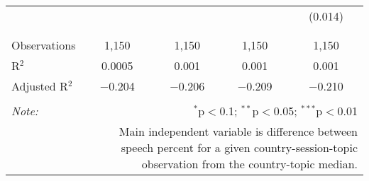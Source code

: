 \begin{table}[!htbp]
\begin{tabular}{@{\extracolsep{5pt}}lcccc}
  &  &  &  & (0.014) \\ 
  & & & & \\ 
\hline \\[-1.8ex] 
Observations & 1,150 & 1,150 & 1,150 & 1,150 \\ 
R$^{2}$ & 0.0005 & 0.001 & 0.001 & 0.001 \\ 
Adjusted R$^{2}$ & $-$0.204 & $-$0.206 & $-$0.209 & $-$0.210 \\ 
\hline 
\hline \\[-1.8ex] 
\textit{Note:}  & \multicolumn{4}{r}{$^{*}$p$<$0.1; $^{**}$p$<$0.05; $^{***}$p$<$0.01} \\ 
 & \multicolumn{4}{r}{Main independent variable is difference between speech percent for a given country-session-topic observation from the country-topic median.} \\ 
\end{tabular} 
\end{table} 
